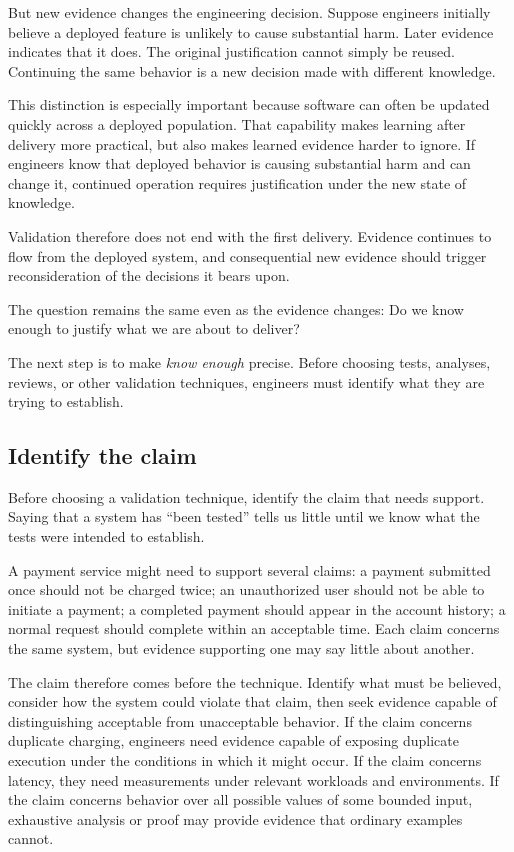 But new evidence changes the engineering decision. Suppose engineers initially believe a deployed
feature is unlikely to cause substantial harm. Later evidence indicates that it does. The original
justification cannot simply be reused. Continuing the same behavior is a new decision made with
different knowledge.

This distinction is especially important because software can often be updated quickly across a
deployed population. That capability makes learning after delivery more practical, but also makes
learned evidence harder to ignore. If engineers know that deployed behavior is causing substantial
harm and can change it, continued operation requires justification under the new state of
knowledge.

Validation therefore does not end with the first delivery. Evidence continues to flow from the
deployed system, and consequential new evidence should trigger reconsideration of the decisions it
bears upon.

The question remains the same even as the evidence changes: Do we know enough to justify what we
are about to deliver?

The next step is to make \emph{know enough} precise. Before choosing tests, analyses, reviews, or other
validation techniques, engineers must identify what they are trying to establish.

\subsection{Identify the claim}\label{sec-claims-evidence}

Before choosing a validation technique, identify the claim that needs support. Saying that a system
has ``been tested'' tells us little until we know what the tests were intended to establish.

A payment service might need to support several claims: a payment submitted once should not be
charged twice; an unauthorized user should not be able to initiate a payment; a completed payment
should appear in the account history; a normal request should complete within an acceptable time.
Each claim concerns the same system, but evidence supporting one may say little about another.

The claim therefore comes before the technique. Identify what must be believed, consider how the
system could violate that claim, then seek evidence capable of distinguishing acceptable from
unacceptable behavior. If the claim concerns duplicate charging, engineers need evidence capable of
exposing duplicate execution under the conditions in which it might occur. If the claim concerns
latency, they need measurements under relevant workloads and environments. If the claim concerns
behavior over all possible values of some bounded input, exhaustive analysis or proof may provide
evidence that ordinary examples cannot.

